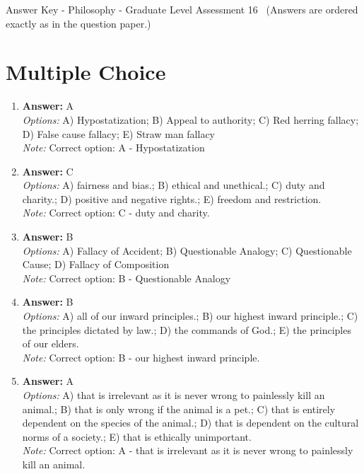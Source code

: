 \documentclass[12pt]{article}
\begin{document}
\begin{center}
Answer Key - Philosophy - Graduate Level Assessment 16 \
\small (Answers are ordered exactly as in the question paper.)
\end{center}

\section*{Multiple Choice}
\begin{enumerate}[label=\arabic*.]
\item \textbf{Answer:} A
\\ \textit{Options:} A) Hypostatization; B) Appeal to authority; C) Red herring fallacy; D) False cause fallacy; E) Straw man fallacy
\\ \textit{Note:} Correct option: A - Hypostatization
\item \textbf{Answer:} C
\\ \textit{Options:} A) fairness and bias.; B) ethical and unethical.; C) duty and charity.; D) positive and negative rights.; E) freedom and restriction.
\\ \textit{Note:} Correct option: C - duty and charity.
\item \textbf{Answer:} B
\\ \textit{Options:} A) Fallacy of Accident; B) Questionable Analogy; C) Questionable Cause; D) Fallacy of Composition
\\ \textit{Note:} Correct option: B - Questionable Analogy
\item \textbf{Answer:} B
\\ \textit{Options:} A) all of our inward principles.; B) our highest inward principle.; C) the principles dictated by law.; D) the commands of God.; E) the principles of our elders.
\\ \textit{Note:} Correct option: B - our highest inward principle.
\item \textbf{Answer:} A
\\ \textit{Options:} A) that is irrelevant as it is never wrong to painlessly kill an animal.; B) that is only wrong if the animal is a pet.; C) that is entirely dependent on the species of the animal.; D) that is dependent on the cultural norms of a society.; E) that is ethically unimportant.
\\ \textit{Note:} Correct option: A - that is irrelevant as it is never wrong to painlessly kill an animal.
\end{enumerate}
\end{document}
